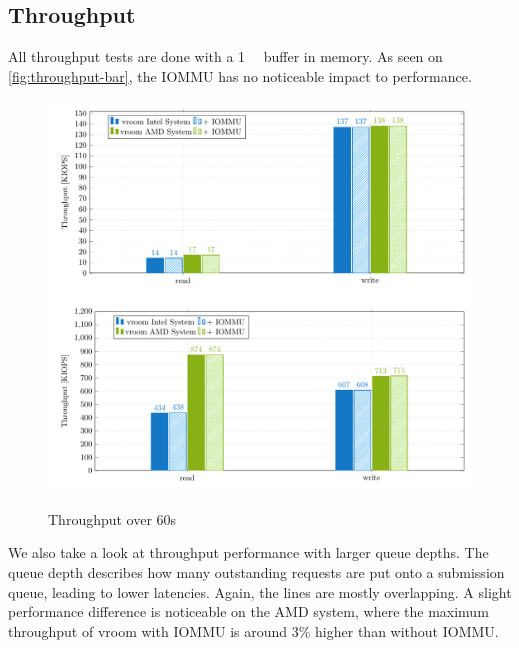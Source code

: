 \subsection{Throughput}
All throughput tests are done with a \qty{1}{\gibi\byte} buffer in memory. As seen on \autoref{fig:throughput-bar}, the IOMMU has no noticeable impact to performance.

\begin{figure}[H]
  \centering
   {\includegraphics[width=.9\textwidth]{figures/throughput_bar_qd1t1} \label{fig:throughput-qd1t1}}
   {\includegraphics[width=.9\textwidth]{figures/throughput_bar_qd32t4} \label{fig:throughput-qd32t4}}
  \caption{Throughput over 60s}
  \label{fig:throughput-bar}
\end{figure}

We also take a look at throughput performance with larger queue depths. The queue depth describes how many outstanding requests are put onto a submission queue, leading to lower latencies. Again, the lines are mostly overlapping. A slight performance difference is noticeable on the AMD system, where the maximum throughput of vroom with IOMMU is around 3\% higher than without IOMMU.

